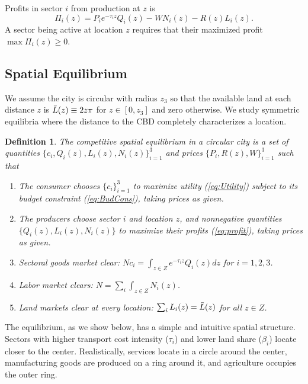 \documentclass[12pt]{article}
\newtheorem{definition}{Definition}
\begin{document}
Profits in sector $i$ from production at $z$ is
\begin{equation}
\label{eq:profit}
\Pi_i(z)=P_ie^{-\tau_iz}Q_i(z)-WN_i(z)-R(z)L_i(z).
\end{equation}
A sector being active at location $z$ requires that their maximized profit $\max\Pi_i(z)\geq0.$

\subsection{Spatial Equilibrium}
We assume the city is circular with radius $z_3$ so that the available land at each distance $z$ is $\Bar L(z) \equiv 2z\pi$ for $z\in[0,z_3]$ and zero otherwise. We study symmetric equilibria where the distance to the CBD completely characterizes a location.

\begin{definition}
The competitive spatial equilibrium in a circular city is a set of quantities $\{c_i, Q_i(z), L_i(z), N_i(z)\}_{i=1}^3$ and prices $\{P_i, R(z), W\}_{i=1}^3$ such that
\begin{enumerate}
    \item The consumer chooses $\{c_i\}_{i=1}^3$ to maximize utility (\ref{eq:Utility}) subject to its budget constraint (\ref{eq:BudCons}), taking prices as given.
    \item The producers choose sector $i$ and location $z$, and nonnegative quantities $\{Q_i(z), L_i(z), N_i(z)\}$ to maximize their profits (\ref{eq:profit}), taking prices as given.
    \item Sectoral goods market clear: $Nc_i=\int_{z\in Z} e^{-\tau_iz}Q_i(z)dz$ for $i=1,2,3$.
    \item Labor market clears: $N=\sum_i\int_{z\in Z} N_i(z)$.
    \item Land markets clear at every location: $\sum_iL_i(z)=\Bar L(z)$ for all $z\in Z$.
\end{enumerate}
\end{definition}
The equilibrium, as we show below, has a simple and intuitive spatial structure. Sectors with higher transport cost intensity ($\tau_i$) and lower land share ($\beta_i$) locate closer to the center. Realistically, services locate in a circle around the center, manufacturing goods are produced on a ring around it, and agriculture occupies the outer ring.
\end{document}
